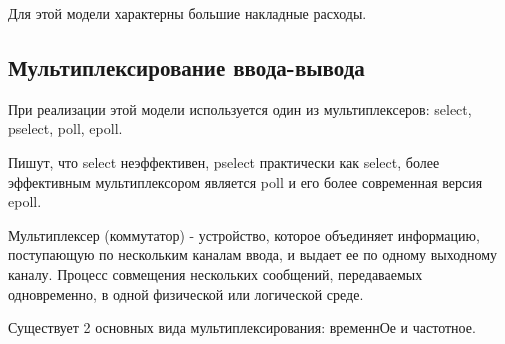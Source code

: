 \documentclass[12pt,a4paper]{scrreprt}
\begin{document}
Для этой модели характерны большие накладные расходы.

\subsection*{Мультиплексирование ввода-вывода}

При реализации этой модели используется один из мультиплексеров: select, pselect, poll, epoll.

Пишут, что select неэффективен, pselect практически как select, более эффективным мультиплексором является poll и его более современная версия epoll. 

Мультиплексер (коммутатор) - устройство, которое объединяет информацию, поступающую по нескольким каналам ввода, и выдает ее по одному выходному каналу. Процесс совмещения нескольких сообщений, передаваемых одновременно, в одной физической или логической среде. 

Существует 2 основных вида мультиплексирования: временнОе и частотное. 

\begin{figure}[!h]
\end{figure}

\begin{figure}[!h]
\end{figure}
\end{document}
